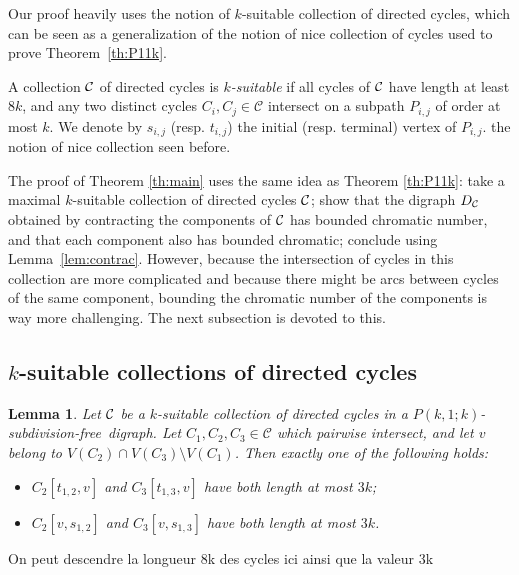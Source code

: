 \documentclass[utf8,10pt]{article}
\theoremstyle{plain}
\newtheorem{lemma}[theorem]{Lemma}
\theoremstyle{definition}
\theoremstyle{remark}
\newcommand{\FH}[1]{{\color{red}{\bf Fred:} #1}}
\newcommand{\free}{subdivision-free}
\begin{document}
Our proof heavily uses the notion of $k$-suitable collection of directed cycles, which can be seen as a generalization of the notion of nice collection of cycles used to prove Theorem~\ref{th:P11k}.

 
 A collection ${\cal C}$ of directed cycles is {\it $k$-suitable} if all cycles of ${\cal C}$ have length at least $8k$, and
any two distinct cycles $C_i,C_j\in\mathcal C$ intersect on  a subpath $P_{i,j}$ of order at most $k$.
We denote by $s_{i,j}$ (resp. $t_{i,j}$) the initial (resp. terminal) vertex of  $P_{i,j}$. %
the notion of nice collection seen before. 

The proof of Theorem \ref{th:main} uses the same idea as Theorem \ref{th:P11k}: take a maximal $k$-suitable collection of directed cycles ${\cal C}$; show that the digraph $D_{\cal C}$ obtained by contracting the components of ${\cal C}$ has bounded chromatic number, and that each component also has bounded chromatic; conclude using Lemma~\ref{lem:contrac}. However, because the intersection of cycles in this collection are more
complicated and because there might be arcs between cycles of the same component, bounding the chromatic number of the components is way more challenging. The next subsection is devoted to this.
 
 
 \subsection{$k$-suitable collections of directed cycles}

 
 
 \begin{lemma}\label{lem:dis}
 Let ${\cal C}$ be a $k$-suitable collection of directed cycles in a $P(k,1;k)$-\free\ digraph.
Let $C_1,C_2,C_3\in\mathcal C$ which pairwise intersect, and let $v$ belong to $V(C_2)\cap V(C_3)\setminus V(C_1)$. 
Then exactly one of the following holds:
\begin{itemize}
\item[(i)] $C_2[t_{1,2}, v]$ and $C_3[t_{1,3}, v]$ have both length at most $3k$; 
\item[(ii)] $C_2[v, s_{1,2}]$ and $C_3[v, s_{1,3}]$ have both length at most $3k$.
\end{itemize}
\end{lemma}

\FH{On peut descendre la longueur 8k des cycles ici ainsi que la valeur 3k}
 
\end{document}
